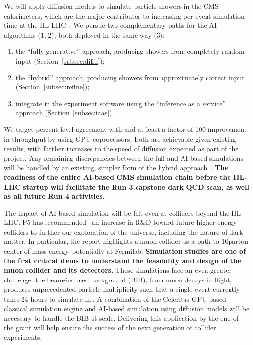 We will apply diffusion models to simulate particle showers in the CMS calorimeters, which are the major contributor to increasing per-event simulation time at the HL-LHC~\cite{Pedro:2020kbk}.
We pursue two complementary paths for the AI algorithms (1, 2), both deployed in the same way (3):
\begin{enumerate}
\item the ``fully generative'' approach, producing showers from completely random input (Section~\ref{subsec:diffu});
\item the ``hybrid'' approach, producing showers from approximately correct input (Section~\ref{subsec:refine});
\item integrate in the experiment software using the ``inference as a service'' approach (Section~\ref{subsec:iaas}).
\end{enumerate}
We target percent-level agreement with \GEANTfour and at least a factor of 100 improvement in throughput by using GPU coprocessors.
Both are achievable given existing results, with further increases to the speed of diffusion expected as part of the project.
Any remaining discrepancies between the full and AI-based simulations will be handled by an existing, simpler form of the hybrid approach~\cite{Bein:2023ylt}.
\textbf{The readiness of the entire AI-based CMS simulation chain before the HL-LHC startup will facilitate the Run 3 capstone dark QCD scan, as well as all future Run 4 activities.}

The impact of AI-based simulation will be felt even at colliders beyond the HL-LHC.
P5 has recommended~\cite{P5:2023} an increase in R\&D toward future higher-energy colliders
to further our exploration of the universe, including the nature of dark matter.
In particular, the report highlights a muon collider as a path to 10\TeV parton center-of-mass energy, potentially at Fermilab.
\textbf{Simulation studies are one of the first critical items to understand the feasibility and design of the muon collider and its detectors.}
These simulations face an even greater challenge: the beam-induced background (BIB), from muon decays in flight, produces unprecedented particle multiplicity
such that a single event currently takes 24 hours to simulate in \GEANTfour.
A combination of the Celeritas GPU-based classical simulation engine and AI-based simulation using diffusion models will be necessary to handle the BIB at scale.
Delivering this application by the end of the grant will help ensure the success of the next generation of collider experiments.

